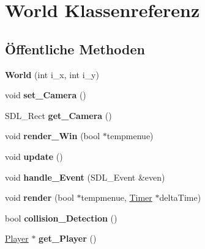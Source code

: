 \hypertarget{class_world}{\section{World Klassenreferenz}
\label{class_world}
}
\subsection*{Öffentliche Methoden}
\begin{DoxyCompactItemize}
\item 
\hypertarget{class_world_a223764f33284a2f1f0bf647ffb210759}{{\bfseries World} (int i\-\_\-x, int i\-\_\-y)}\label{class_world_a223764f33284a2f1f0bf647ffb210759}

\item 
\hypertarget{class_world_a149a22406179d656aea426c32577bed9}{void {\bfseries set\-\_\-\-Camera} ()}\label{class_world_a149a22406179d656aea426c32577bed9}

\item 
\hypertarget{class_world_ae55ead4b6828a5f2b3a6d93e8c947c97}{S\-D\-L\-\_\-\-Rect {\bfseries get\-\_\-\-Camera} ()}\label{class_world_ae55ead4b6828a5f2b3a6d93e8c947c97}

\item 
\hypertarget{class_world_a9164eb25c327d3c1153deb6a6fd89a83}{void {\bfseries render\-\_\-\-Win} (bool $\ast$tempmenue)}\label{class_world_a9164eb25c327d3c1153deb6a6fd89a83}

\item 
\hypertarget{class_world_aac8c1fde63c06577ffc648aaefdb37f0}{void {\bfseries update} ()}\label{class_world_aac8c1fde63c06577ffc648aaefdb37f0}

\item 
\hypertarget{class_world_a6e9d1717aae39babd17d801a7de6486d}{void {\bfseries handle\-\_\-\-Event} (S\-D\-L\-\_\-\-Event \&even)}\label{class_world_a6e9d1717aae39babd17d801a7de6486d}

\item 
\hypertarget{class_world_a15a2d4bb5a4f26400a6c1365d8eb4875}{void {\bfseries render} (bool $\ast$tempmenue, \hyperlink{class_timer}{Timer} $\ast$delta\-Time)}\label{class_world_a15a2d4bb5a4f26400a6c1365d8eb4875}

\item 
\hypertarget{class_world_ae324f881eae678d166eb81321dc8cbab}{bool {\bfseries collision\-\_\-\-Detection} ()}\label{class_world_ae324f881eae678d166eb81321dc8cbab}

\item 
\hypertarget{class_world_af0d1ca602664a0a005cf1521b6aee784}{\hyperlink{class_player}{Player} $\ast$ {\bfseries get\-\_\-\-Player} ()}\label{class_world_af0d1ca602664a0a005cf1521b6aee784}


\end{DoxyCompactItemize}

